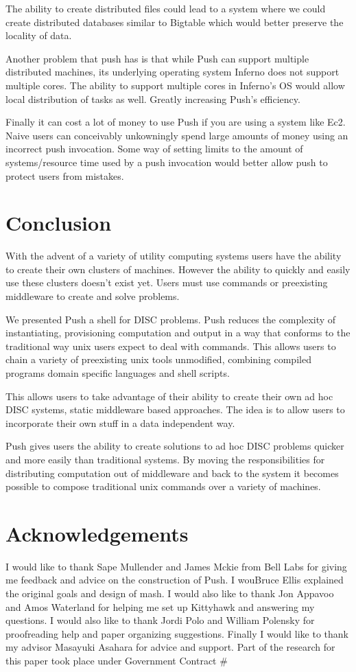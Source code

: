 \documentclass[11pt, letterpaper]{article}
\begin{document}
The ability to create distributed files could lead to a system where we could create distributed databases similar to Bigtable which would better preserve the locality of data. 

Another problem that push has is that while Push can support multiple distributed machines, its underlying operating system Inferno does not support multiple cores. The ability to support multiple cores in Inferno's OS would allow local distribution of tasks as well. Greatly increasing Push's efficiency. 

Finally it can cost a lot of money to use Push if you are using a system like Ec2. Naive users can conceivably unkowningly spend large amounts of money using an incorrect push invocation. Some way of setting limits to the amount of systems/resource time used by a push invocation would better allow push to protect users from mistakes. 
\section{Conclusion}

With the advent of a variety of utility computing systems users have the ability to create their own clusters of machines. However the ability to quickly and easily use these clusters doesn't exist yet. Users must use commands or preexisting middleware to create and solve problems. 

We presented Push a shell for DISC problems. Push reduces the complexity of instantiating, provisioning computation and output in a way that conforms to the traditional way unix users expect to deal with commands. This allows users to chain a variety of preexisting unix tools unmodified, combining compiled programs domain specific languages and shell scripts. 

This allows users to take advantage of their ability to create their own ad hoc DISC systems, static middleware based approaches. The idea is to allow users to incorporate their own stuff in a data independent way. 

Push gives users the ability to create solutions to ad hoc DISC problems quicker and more easily than traditional systems. By moving the responsibilities for distributing computation out of middleware and back to the system it becomes possible to compose traditional unix commands over a variety of machines. 

\section{Acknowledgements}
 
I would like to thank Sape Mullender and James Mckie from Bell Labs for giving me feedback and advice on the construction of Push. I wouBruce Ellis explained the original goals and design of mash.  I would also like to thank Jon Appavoo and Amos Waterland for helping me set up Kittyhawk and answering my questions. I would also like to thank Jordi Polo and William Polensky for proofreading help and paper organizing suggestions. Finally I would like to thank my advisor Masayuki Asahara for advice and support.  Part of the research for this paper took place under Government Contract \#
\cite{thompson1993hwo}

 
\end{document}
